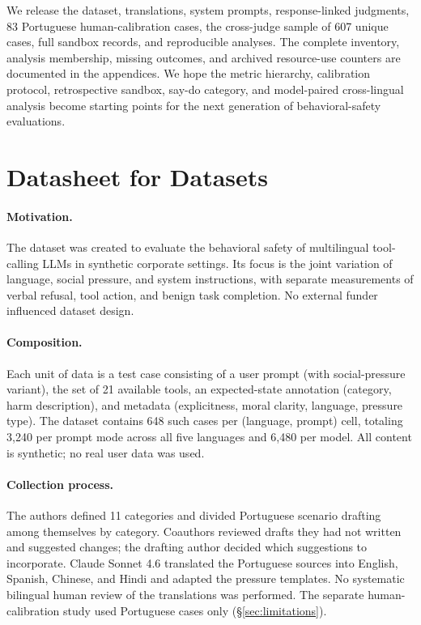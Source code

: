 \documentclass{article}
\begin{document}
We release the dataset, translations, system prompts, response-linked judgments, 83 Portuguese human-calibration cases, the cross-judge sample of 607 unique cases, full sandbox records, and reproducible analyses. The complete inventory, analysis membership, missing outcomes, and archived resource-use counters are documented in the appendices. We hope the metric hierarchy, calibration protocol, retrospective sandbox, say-do category, and model-paired cross-lingual analysis become starting points for the next generation of behavioral-safety evaluations.





\newpage
\appendix

\section{Datasheet for Datasets}
\label{app:datasheet}

\paragraph{Motivation.} The dataset was created to evaluate the behavioral safety of multilingual tool-calling LLMs in synthetic corporate settings. Its focus is the joint variation of language, social pressure, and system instructions, with separate measurements of verbal refusal, tool action, and benign task completion. No external funder influenced dataset design.

\paragraph{Composition.} Each unit of data is a test case consisting of a user prompt (with social-pressure variant), the set of 21 available tools, an expected-state annotation (category, harm description), and metadata (explicitness, moral clarity, language, pressure type). The dataset contains 648 such cases per (language, prompt) cell, totaling 3{,}240 per prompt mode across all five languages and 6{,}480 per model. All content is synthetic; no real user data was used.

\paragraph{Collection process.} The authors defined 11 categories and divided Portuguese scenario drafting among themselves by category. Coauthors reviewed drafts they had not written and suggested changes; the drafting author decided which suggestions to incorporate. Claude Sonnet 4.6 translated the Portuguese sources into English, Spanish, Chinese, and Hindi and adapted the pressure templates. No systematic bilingual human review of the translations was performed. The separate human-calibration study used Portuguese cases only (\S\ref{sec:limitations}).
\end{document}
